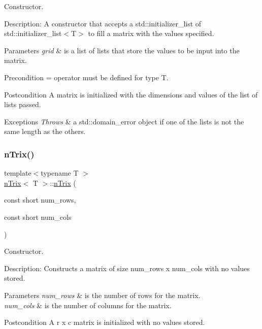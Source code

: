 Constructor. 

Description\+: A constructor that accepts a std\+::initializer\+\_\+list of std\+::initializer\+\_\+list$<$\+T$>$ to fill a matrix with the values specified. 
\begin{DoxyParams}{Parameters}
{\em grid} & is a list of lists that store the values to be input into the matrix. \\
\hline
\end{DoxyParams}
\begin{DoxyPrecond}{Precondition}
= operator must be defined for type T. 
\end{DoxyPrecond}
\begin{DoxyPostcond}{Postcondition}
A matrix is initialized with the dimensions and values of the list of lists passed. 
\end{DoxyPostcond}

\begin{DoxyExceptions}{Exceptions}
{\em Throws} & a std\+::domain\+\_\+error object if one of the lists is not the same length as the others. \\
\hline
\end{DoxyExceptions}
\mbox{\label{classnTrix_ac0b8db0c386024c87d57b8c0e3a31c65}} 
\subsubsection{\texorpdfstring{n\+Trix()}{nTrix()}\hspace{0.1cm}{\footnotesize\ttfamily [3/5]}}
{\footnotesize\ttfamily template$<$typename T $>$ \\
\hyperlink{classnTrix}{n\+Trix}$<$ T $>$\+::\hyperlink{classnTrix}{n\+Trix} (\begin{DoxyParamCaption}\item[{const short}]{num\+\_\+rows,  }\item[{const short}]{num\+\_\+cols }\end{DoxyParamCaption})}



Constructor. 

Description\+: Constructs a matrix of size num\+\_\+rows x num\+\_\+cols with no values stored. 
\begin{DoxyParams}{Parameters}
{\em num\+\_\+rows} & is the number of rows for the matrix. \\
\hline
{\em num\+\_\+cols} & is the number of columns for the matrix. \\
\hline
\end{DoxyParams}
\begin{DoxyPostcond}{Postcondition}
A r x c matrix is initialized with no values stored. 
\end{DoxyPostcond}

